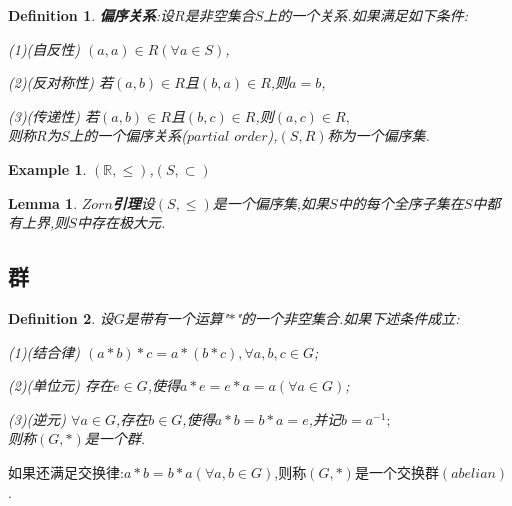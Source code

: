 \documentclass[UTF8]{article}
\newtheorem{defn}{Definition}[section]
\newtheorem{exa}{Example}[section]
\newtheorem{lem}{Lemma}[section]
\begin{document}
\begin{defn}
	\textbf{偏序关系}:设$R$是非空集合$S$上的一个关系.如果满足如下条件:
	
	(1)(自反性) $(a,a)\in R(\forall a\in S)$,
	
	(2)(反对称性) 若$(a,b)\in R$且$(b,a)\in R$,则$a=b$,
	
	(3)(传递性) 若$(a,b)\in R$且$(b,c)\in R$,则$(a,c)\in R,$\\则称$R$为$S$上的一个偏序关系($partial$ $order$),$(S,R)$称为一个偏序集.
\end{defn}

\begin{exa}
	\quad$(\mathbb{R},\le)$,$(S,\subset)$
\end{exa}

\begin{lem}
	\textbf{$Zorn$引理}\quad 设$(S,\le)$是一个偏序集,如果$S$中的每个全序子集在$S$中都有上界,则$S$中存在极大元.
\end{lem}

\subsection{群}
\normalsize

\begin{defn}
	\quad 设$G$是带有一个运算"$\ast$"的一个非空集合.如果下述条件成立:
	
	(1)(结合律) $(a\ast b)\ast c=a\ast(b\ast c),\forall a,b,c\in G$;
	
	(2)(单位元) 存在$\mathit{e}\in G$,使得$a\ast\mathit{e}=\mathit{e}\ast a=a(\forall a\in G)$;
	
	(3)(逆元) $\forall a\in G$,存在$b\in G$,使得$a\ast b=b\ast a=\mathit{e}$,并记$b=a^{-1};$\\则称$(G,\ast)$是一个群.
\end{defn}

如果还满足交换律:$a\ast b=b\ast a(\forall a,b\in G)$,则称$(G,\ast)$是一个$\textbf{交换群}(abelian)$.
\end{document}
